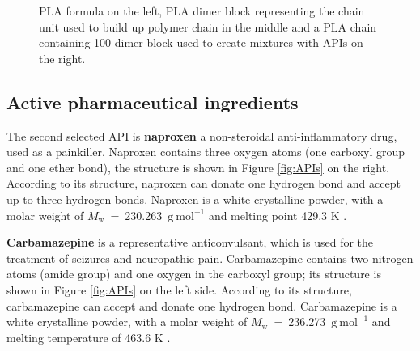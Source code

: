 \begin{figure}[htb]
\begin{subfigure}{0.33\textwidth}
    	\end{subfigure}
    	\caption{PLA formula on the left, PLA dimer block representing the chain unit used to build up polymer chain in the middle and a PLA chain containing 100 dimer block used to create mixtures with APIs on the right.}
    	\vspace{-0.5cm}
    	\label{fig:pla}
    \end{figure}
    
    \subsection{Active pharmaceutical ingredients}


    The second selected API is \textbf{naproxen} a non-steroidal anti-inflammatory drug, used as a painkiller. Naproxen contains three oxygen atoms (one carboxyl group and one ether bond), the structure is shown in Figure \ref{fig:APIs} on the right. According to its structure, naproxen can donate one hydrogen bond and accept up to three hydrogen bonds. Naproxen is a white crystalline powder, with a molar weight of $M_\mathrm{w}$~=~230.263~$\mathrm{g\ mol^{-1}}$ and melting point 429.3 K \cite{stejfa_heat_2021}.

    \textbf{Carbamazepine} is a representative anticonvulsant, which is used for the treatment of seizures and neuropathic pain. Carbamazepine contains two nitrogen atoms (amide group) and one oxygen in the carboxyl group; its structure is shown in Figure \ref{fig:APIs} on the left side. According to its structure, carbamazepine can accept and donate one hydrogen bond. Carbamazepine is a white crystalline powder, with a molar weight of $M_\mathrm{w}$~=~236.273~$\mathrm{g\ mol^{-1}}$ and melting temperature of 463.6 K \cite{stejfa_heat_2021}.

